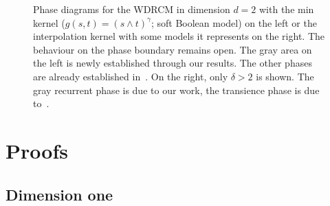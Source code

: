 \documentclass[11pt,a4paper]{scrartcl}
\newcommand{\1}{\mathbb{1}}
\begin{document}
\begin{figure}[ht!]
\begin{subfigure}{0.5\textwidth}
{
    }
\end{subfigure}
\caption{Phase diagrams for the WDRCM in dimension \(d=2\) with the min kernel ($g(s,t)=(s\wedge t)^\gamma$; soft Boolean model) on the left or the interpolation kernel with some models it represents on the right. The behaviour on the phase boundary remains open. The gray area on the left is newly established through our results. The other phases are already established in~\cite{GHMM2022,Baeumler2023_recurrence,Moench2024}. On the right, only \(\delta>2\) is shown. The gray recurrent phase is due to our work, the transience phase is due to~\cite{Moench2024}.}
\label{figure1}
\end{figure}

\section{Proofs}
\label{sec:proofs}

\subsection{Dimension one}
\label{sec:proofs-d1}
\end{document}
